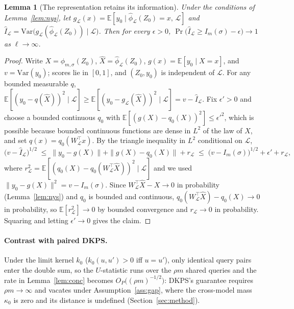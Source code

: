 \documentclass{article}
\newtheorem{lemma}{Lemma}
\theoremstyle{definition}
\theoremstyle{plain}
\begin{document}
\begin{lemma}[The representation retains its information]
\label{lem:info}
Under the conditions of Lemma~\ref{lem:nys}, let
$g_{\mathcal{L}}(x)=\mathbb{E}[y_0\mid\hat\phi_{\mathcal{L}}(Z_0)=x,\,\mathcal{L}]$ and
$\hat I_{\mathcal{L}}=\mathrm{Var}\big(g_{\mathcal{L}}(\hat\phi_{\mathcal{L}}(Z_0))\mid \mathcal{L}\big)$. Then for every
$\epsilon>0$, $\Pr\big(\hat I_{\mathcal{L}}\ge I_m(\sigma)-\epsilon\big)\to1$ as $\ell\to\infty$.
\end{lemma}
\begin{proof}
Write $X=\phi_{m,\sigma}(Z_0)$, $\hat X=\hat\phi_{\mathcal{L}}(Z_0)$,
$g(x)=\mathbb{E}[y_0\mid X=x]$, and $v=\mathrm{Var}(y_0)$; scores lie in $[0,1]$, and
$(Z_0,y_0)$ is independent of $\mathcal{L}$. For any bounded measurable $q$,
$\mathbb{E}[(y_0-q(\hat X))^2\mid \mathcal{L}]\ge\mathbb{E}[(y_0-g_{\mathcal{L}}(\hat X))^2\mid \mathcal{L}]=v-\hat I_{\mathcal{L}}$.
Fix $\epsilon'>0$ and choose a bounded continuous $q_0$ with
$\mathbb{E}[(g(X)-q_0(X))^2]\le\epsilon'^2$, which is possible because bounded
continuous functions are dense in $L^2$ of the law of $X$, and set
$q(x)=q_0(W_{\mathcal{L}}^\top x)$. By the triangle inequality in $L^2$ conditional on $\mathcal{L}$,
\[
\big(v-\hat I_{\mathcal{L}}\big)^{1/2}\;\le\;\|y_0-g(X)\|+\|g(X)-q_0(X)\|+r_{\mathcal{L}}
\;\le\;\big(v-I_m(\sigma)\big)^{1/2}+\epsilon'+r_{\mathcal{L}},
\]
where $r_{\mathcal{L}}^2=\mathbb{E}[(q_0(X)-q_0(W_{\mathcal{L}}^\top\hat X))^2\mid \mathcal{L}]$ and we used
$\|y_0-g(X)\|^2=v-I_m(\sigma)$. Since $W_{\mathcal{L}}^\top\hat X-X\to0$ in probability
(Lemma~\ref{lem:nys}) and $q_0$ is bounded and continuous,
$q_0(W_{\mathcal{L}}^\top\hat X)-q_0(X)\to0$ in probability, so $\mathbb{E}[r_{\mathcal{L}}^2]\to0$ by
bounded convergence and $r_{\mathcal{L}}\to0$ in probability. Squaring and letting
$\epsilon'\to0$ gives the claim.
\end{proof}

\paragraph{Contrast with paired DKPS.} Under the limit kernel $k_{0}$
($k_{0}(u,u')>0$ iff $u=u'$), only identical query pairs enter the double sum, so the
$U$-statistic runs over the $\rho m$ shared queries
and the rate in Lemma~\ref{lem:conc} becomes $O_P\big((\rho m)^{-1/2}\big)$: DKPS's
guarantee requires $\rho m\to\infty$ and vacates under Assumption~\ref{ass:gap},
where the cross-model mass $\kappa_{0}$ is zero and its distance is undefined
(Section~\ref{sec:method}).
\end{document}
